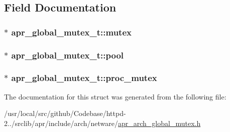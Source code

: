 \subsection{Field Documentation}
\subsubsection[{\texorpdfstring{mutex}{mutex}}]{$\ast$ apr\+\_\+global\+\_\+mutex\+\_\+t\+::mutex}\hypertarget{structapr__global__mutex__t_a0464d8cc4d113c844588bf0fb98f7fa9}{}\label{structapr__global__mutex__t_a0464d8cc4d113c844588bf0fb98f7fa9}
\subsubsection[{\texorpdfstring{pool}{pool}}]{ $\ast$ apr\+\_\+global\+\_\+mutex\+\_\+t\+::pool}\hypertarget{structapr__global__mutex__t_a9503c0abf18f7b498ecbf4233eefbcd8}{}\label{structapr__global__mutex__t_a9503c0abf18f7b498ecbf4233eefbcd8}
\subsubsection[{\texorpdfstring{proc\+\_\+mutex}{proc_mutex}}]{$\ast$ apr\+\_\+global\+\_\+mutex\+\_\+t\+::proc\+\_\+mutex}\hypertarget{structapr__global__mutex__t_a0b19e0f205f5cb03ec7e7f334c7dbce8}{}\label{structapr__global__mutex__t_a0b19e0f205f5cb03ec7e7f334c7dbce8}


The documentation for this struct was generated from the following file\+:\begin{DoxyCompactItemize}
\item 
/usr/local/src/github/\+Codebase/httpd-\/2../srclib/apr/include/arch/netware/\hyperlink{netware_2apr__arch__global__mutex_8h}{apr\+\_\+arch\+\_\+global\+\_\+mutex.\+h}\end{DoxyCompactItemize}
